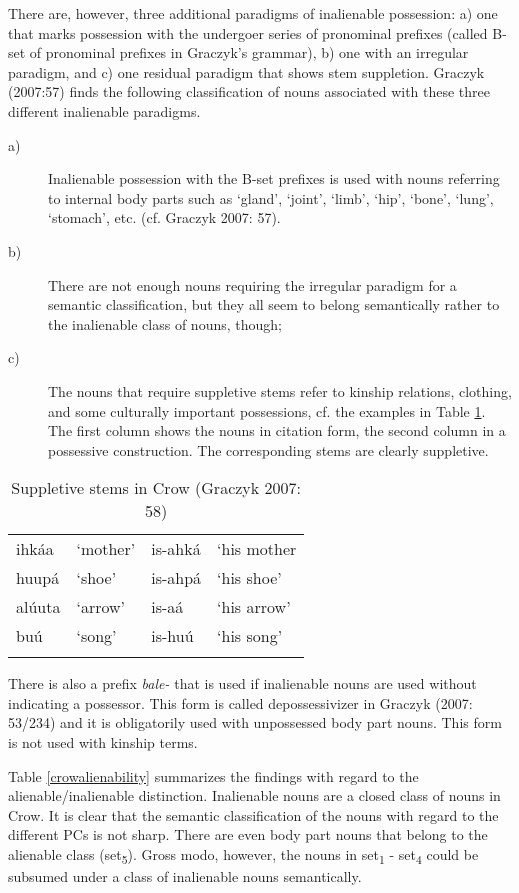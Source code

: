 \documentclass[output=paper]{LSP/langsci}
\begin{document}
There are, however, three additional paradigms of inalienable possession: a) one that marks possession with the undergoer series of pronominal prefixes (called B-set of pronominal prefixes in Graczyk's grammar), b) one with an irregular paradigm, and c) one residual paradigm that shows stem suppletion. Graczyk (2007:57) finds the following classification of nouns associated with these three different inalienable paradigms.

\begin{description}
\item[a)] Inalienable possession with the B-set prefixes is used with nouns referring to internal body parts such as `gland', `joint', `limb', `hip', `bone', `lung', `stomach', etc. (cf. Graczyk 2007: 57).

\item[b)] There are not enough nouns requiring the irregular paradigm for a semantic classification, but they all seem to belong semantically rather to the inalienable class of nouns, though;

\item[c)] The nouns that require suppletive stems refer to kinship relations, clothing, and some culturally important possessions, cf. the examples in Table \ref{crowsuppletion}. The first column shows the nouns in citation form, the second column in a possessive construction. The corresponding stems are clearly suppletive. 
\end{description}

\begin{table}
\caption{Suppletive stems in Crow (Graczyk 2007: 58)} \label{crowsuppletion}
\begin{tabular}[h]{ l l l l}
\lsptoprule
 ihkáa	 & `mother'	& is-ahká	& `his mother \\
 huupá & `shoe' &  is-ahpá	 &  `his shoe'\\
alúuta &  `arrow' & is-aá &  `his arrow'\\
buú & `song'	&  is-huú & `his song'\\
\lspbottomrule
\end{tabular}
\end{table}

There is also a prefix \textit{bale-} that is used if inalienable nouns are used without indicating a possessor. This form is called depossessivizer in Graczyk (2007: 53/234) and it is obligatorily used with unpossessed body part nouns. This form is not used with kinship terms.

Table \ref{crowalienability} summarizes the findings with regard to the alienable/inalienable distinction. Inalienable nouns are a closed class of nouns in Crow. It is clear that the semantic classification of the nouns with regard to the different PCs is not sharp. There are even body part nouns that belong to the alienable class (set\textsubscript{5}). Gross modo, however, the nouns in set\textsubscript{1} - set\textsubscript{4} could be subsumed under a class of inalienable nouns semantically.
\end{document}
